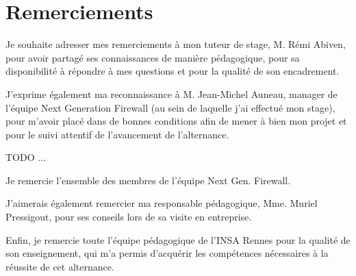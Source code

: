 \section*{Remerciements}

Je souhaite adresser mes remerciements à mon tuteur de stage, M. Rémi Abiven, pour avoir partagé ses connaissances de manière pédagogique, pour sa disponibilité à répondre à mes questions et pour la qualité de son encadrement.

J’exprime également ma reconnaissance à M. Jean-Michel Auneau, manager de l’équipe Next Generation Firewall (au sein de laquelle j’ai effectué mon stage), pour m’avoir placé dans de bonnes conditions afin de mener à bien mon projet et pour le suivi attentif de l’avancement de l'alternance.

TODO ...

Je remercie l’ensemble des membres de l’équipe Next Gen. Firewall. 

J’aimerais également remercier ma responsable pédagogique, Mme. Muriel Pressigout, pour ses conseils lors de sa visite en entreprise.

Enfin, je remercie toute l’équipe pédagogique de l’INSA Rennes pour la qualité de son enseignement, qui m’a permis d’acquérir les compétences nécessaires à la réussite de cet alternance.